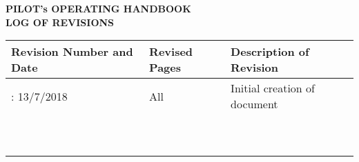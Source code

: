\thispagestyle{fancy}

\begin{center}
\textbf{PILOT's OPERATING HANDBOOK\\
LOG OF REVISIONS\\[0.25in]
}


  \begin{tabularx}{\linewidth}{
    |>{\hsize=0.25\hsize}X| 
    >{\hsize=0.25\hsize}X|
    >{\hsize=0.5\hsize}X| 
  }
 \hline
  Revision Number and Date & Revised Pages &  Description of Revision \\ 
 \hline
  1: 13/7/2018 & All & Initial creation of document\\ 
 \hline
  &  & \\ 
 \hline
  &  & \\ 
 \hline
  &  & \\ 
 \hline
  &  & \\ 
 \hline
  &  & \\ 
 \hline
  &  & \\ 
 \hline
  &  & \\ 
 \hline
  &  & \\ 
 \hline
  &  & \\ 
 \hline
  &  & \\ 
 \hline
\end{tabularx}

\end{center}